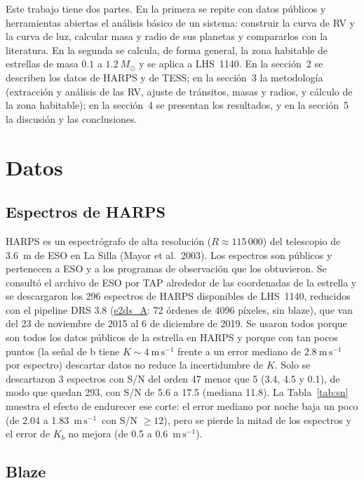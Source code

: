 \documentclass[twocolumn,aps,pra,11pt]{revtex4-2}
\newcommand{\Msun}{\ensuremath{M_\odot}}
\newcommand{\ms}{\ensuremath{\mathrm{m\,s^{-1}}}}
\newcommand{\nb}[1]{\url{#1}}
\begin{document}
Este trabajo tiene dos partes. En la primera se repite con datos públicos y herramientas abiertas el análisis básico de un sistema: construir la curva de RV y la curva de luz, calcular masa y radio de sus planetas y compararlos con la literatura. En la segunda se calcula, de forma general, la zona habitable de estrellas de masa $0.1$ a $1.2~\Msun$ y se aplica a LHS~1140. En la sección~2 se describen los datos de HARPS y de TESS; en la sección~3 la metodología (extracción y análisis de las RV, ajuste de tránsitos, masas y radios, y cálculo de la zona habitable); en la sección~4 se presentan los resultados, y en la sección~5 la discusión y las conclusiones.

\section{Datos}

\subsection{Espectros de HARPS}

HARPS es un espectrógrafo de alta resolución ($R \approx 115\,000$) del telescopio de 3.6~m de ESO en La Silla (Mayor et al.\ 2003). Los espectros son públicos y pertenecen a ESO y a los programas de observación que los obtuvieron. Se consultó el archivo de ESO por TAP alrededor de las coordenadas de la estrella y se descargaron los 296 espectros de HARPS disponibles de LHS~1140, reducidos con el pipeline DRS 3.8 (\nb{e2ds_A}: 72 órdenes de 4096 píxeles, sin blaze), que van del 23 de noviembre de 2015 al 6 de diciembre de 2019.
Se usaron todos porque son todos los datos públicos de la estrella en HARPS y porque con tan pocos puntos (la señal de b tiene $K\sim 4~\ms$ frente a un error mediano de $2.8~\ms$ por espectro) descartar datos no reduce la incertidumbre de $K$. Solo se descartaron 3 espectros con S/N del orden 47 menor que 5 (3.4, 4.5 y 0.1), de modo que quedan 293, con S/N de 5.6 a 17.5 (mediana 11.8). La Tabla~\ref{tab:sn} muestra el efecto de endurecer ese corte: el error mediano por noche baja un poco (de 2.04 a 1.83~\ms\ con S/N $\ge 12$), pero se pierde la mitad de los espectros y el error de $K_b$ no mejora (de 0.5 a 0.6~\ms).

\subsection{Blaze}\label{sec:blaze}
\end{document}
